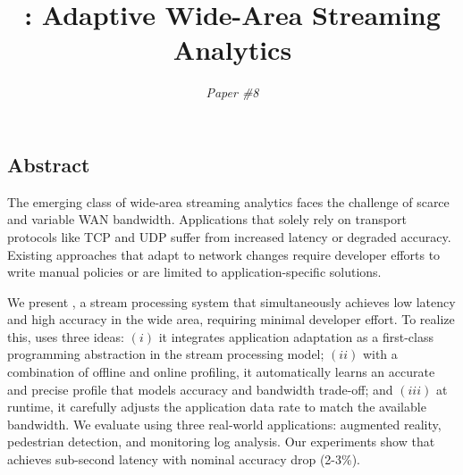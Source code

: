 \documentclass[twocolumn, 9pt]{article}
\begin{document}
\date{}



\title{\sysname{}: Adaptive Wide-Area Streaming Analytics}

\author{
  \textit{Paper \#8}
}

\maketitle

\subsection*{Abstract}

The emerging class of wide-area streaming analytics faces the challenge of
scarce and variable WAN bandwidth. Applications that solely rely on transport
protocols like TCP and UDP suffer from increased latency or degraded
accuracy. Existing approaches that adapt to network changes require developer
efforts to write manual policies or are limited to application-specific
solutions.

We present \sysname{}, a stream processing system that simultaneously achieves
low latency and high accuracy in the wide area, requiring minimal developer
effort. To realize this, \sysname{} uses three ideas: $(i)$ it integrates
application adaptation as a first-class programming abstraction in the stream
processing model; $(ii)$ with a combination of offline and online profiling, it
automatically learns an accurate and precise profile that models accuracy and
bandwidth trade-off; and $(iii)$ at runtime, it carefully adjusts the
application data rate to match the available bandwidth. We evaluate \sysname{}
using three real-world applications: augmented reality, pedestrian detection,
and monitoring log analysis. Our experiments show that \sysname{} achieves
sub-second latency with nominal accuracy drop (2-3\%).










% 

{\footnotesize 
}

\begin{appendices}

\end{appendices}
\end{document}

